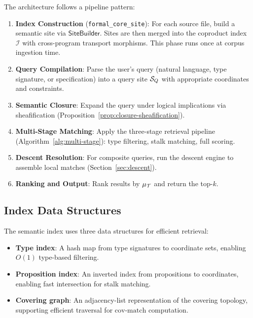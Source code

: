 \documentclass[11pt]{article}
\newcommand{\FormalCoreSite}{\texttt{formal\_core\_site}}
\newcommand{\SemIndex}{\mathcal{I}}
\newcommand{\MatchScore}{\mu}
\newcommand{\CoverMatch}{\mathrm{cov\text{-}match}}
\begin{document}
The architecture follows a pipeline pattern:

\begin{enumerate}[noitemsep]
  \item \textbf{Index Construction} (\FormalCoreSite): For each source
        file, build a semantic site via $\mathsf{SiteBuilder}$.  Sites
        are then merged into the coproduct index $\SemIndex$ with
        cross-program transport morphisms.  This phase runs once at
        corpus ingestion time.
  \item \textbf{Query Compilation}: Parse the user's query (natural
        language, type signature, or specification) into a query site
        $\mathcal{S}_Q$ with appropriate coordinates and constraints.
  \item \textbf{Semantic Closure}: Expand the query under logical
        implications via sheafification
        (Proposition~\ref{prop:closure-sheafification}).
  \item \textbf{Multi-Stage Matching}: Apply the three-stage retrieval
        pipeline (Algorithm~\ref{alg:multi-stage}): type filtering,
        stalk matching, full scoring.
  \item \textbf{Descent Resolution}: For composite queries, run the
        descent engine to assemble local matches
        (Section~\ref{sec:descent}).
  \item \textbf{Ranking and Output}: Rank results by
        $\MatchScore_{\trust}$ and return the top-$k$.
\end{enumerate}

\subsection{Index Data Structures}

The semantic index uses three data structures for efficient retrieval:

\begin{itemize}[noitemsep]
  \item \textbf{Type index}: A hash map from type signatures to
        coordinate sets, enabling $O(1)$ type-based filtering.
  \item \textbf{Proposition index}: An inverted index from propositions
        to coordinates, enabling fast intersection for stalk matching.
  \item \textbf{Covering graph}: An adjacency-list representation of
        the covering topology, supporting efficient traversal for
        $\CoverMatch$ computation.
\end{itemize}
\end{document}
